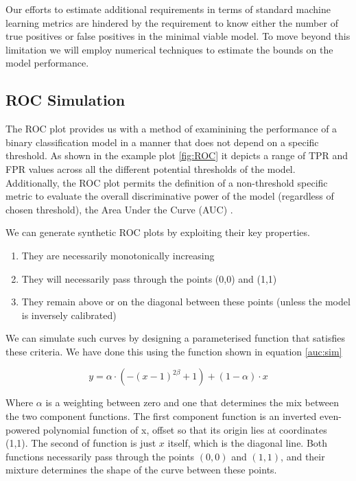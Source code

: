 \documentclass[12pt,a4paper]{article}
\numberwithin{equation}{section}
\begin{document}
Our efforts to estimate additional requirements in terms of standard machine learning metrics are hindered by the requirement to know
either the number of true positives or false positives in the minimal viable model.
To move beyond this limitation we will employ numerical techniques to estimate the bounds on the model performance.

\subsection{ROC Simulation}

The ROC plot provides us with a method of examinining the performance of a binary classification model 
in a manner that does not depend on a specific threshold. As shown in the example plot \ref{fig:ROC}
it depicts a range of TPR and FPR values across all the different potential thresholds of the model.
Additionally, the ROC plot permits the definition of a non-threshold specific metric to evaluate the overall
discriminative power of the model (regardless of chosen threshold), the Area Under the Curve (AUC) \cite{Bradley97}.

We can generate synthetic ROC plots by exploiting their key properties.

\begin{enumerate}
	\item They are necessarily monotonically increasing
	\item They will necessarily pass through the points (0,0) and (1,1)
	\item They remain above or on the diagonal between these points (unless the model is inversely calibrated)
\end{enumerate}

We can simulate such curves by designing a parameterised function that satisfies these
criteria. We have done this using the function shown in equation \ref{auc:sim} 

\begin{equation}
\label{auc:sim}
y = \alpha \cdot (-(x-1)^{2\beta}+1) + (1-\alpha) \cdot x
\end{equation}

Where $\alpha$ is a weighting between zero and one that determines the 
mix between the two component functions. The first component function is an 
inverted even-powered polynomial function of x, offset so that its origin 
lies at coordinates {(1,1)}.
The second of function is just $x$ itself, which is the diagonal line.
Both functions necessarily pass through 
the points $(0,0)$ and $(1,1)$, and their mixture determines the shape of the
curve between these points.
 
\end{document}
